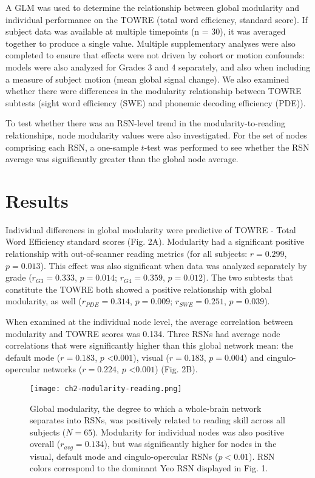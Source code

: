 A GLM was used to determine the relationship between global modularity and individual performance on the TOWRE (total word efficiency, standard score). If subject data was available at multiple timepoints (n = 30), it was averaged together to produce a single value. Multiple supplementary analyses were also completed to ensure that effects were not driven by cohort or motion confounds: models were also analyzed for Grades 3 and 4 separately, and also when including a measure of subject motion (mean global signal change). We also examined whether there were differences in the modularity relationship between TOWRE subtests (sight word efficiency (SWE) and phonemic decoding efficiency (PDE)).

To test whether there was an RSN-level trend in the modularity-to-reading relationships, node modularity values were also investigated. For the set of nodes comprising each RSN, a one-sample $t$-test was performed to see whether the RSN average was significantly greater than the global node average. 

\section{Results} 

Individual differences in global modularity were predictive of TOWRE - Total Word Efficiency standard scores (Fig. 2A). Modularity had a significant positive relationship with out-of-scanner reading metrics (for all subjects: $r = 0.299$, $p = 0.013$). This effect was also significant when data was analyzed separately by grade ($r_{G3} = 0.333$, $p = 0.014$; $r_{G4} = 0.359$, $p = 0.012$). The two subtests that constitute the TOWRE both showed a positive relationship with global modularity, as well ($r_{PDE} = 0.314$, $p = 0.009$; $r_{SWE} = 0.251$, $p = 0.039$). 

When examined at the individual node level, the average correlation between modularity and TOWRE scores was 0.134. Three RSNs had average node correlations that were significantly higher than this global network mean: the default mode ($r = 0.183$, $p$ \textless $0.001$), visual ($r = 0.183$, $p = 0.004$) and cingulo-opercular networks ($r = 0.224$, $p$ \textless $0.001$) (Fig. 2B). 


\begin{figure}[h!]
\centering
\texttt{[image: ch2-modularity-reading.png]}
\caption[Modularity metrics at rest predict reading skill.] {Global modularity, the degree to which a whole-brain network separates into RSNs, was positively related to reading skill across all subjects ($N = 65$). Modularity for individual nodes was also positive overall ($r_{avg} = 0.134$), but was significantly higher for nodes in the visual, default mode and cingulo-opercular RSNs ($p < 0.01$). RSN colors correspond to the dominant Yeo RSN displayed in Fig. 1.}
\label{fig:texlogo}
\end{figure}


